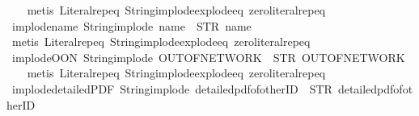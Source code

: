 \begin{isabellebody}
%
\isadelimproof
\ \ %
\endisadelimproof
%
\isatagproof
{}\isamarkupfalse%
\ {\isacharparenleft}metis\ Literal{\isachardot}rep{\isacharunderscore}eq\ String{\isachardot}implode{\isacharunderscore}explode{\isacharunderscore}eq\ zero{\isacharunderscore}literal{\isachardot}rep{\isacharunderscore}eq{\isacharparenright}%
\endisatagproof
{\isafoldproof}%
%
\isadelimproof
\isanewline
%
\endisadelimproof
\isanewline
{}\isamarkupfalse%
\ implode{\isacharunderscore}name{\isacharcolon}\ {\isachardoublequoteopen}String{\isachardot}implode\ {\isacharprime}{\isacharprime}name{\isacharprime}{\isacharprime}\ {\isacharequal}\ STR\ {\isacharprime}{\isacharprime}name{\isacharprime}{\isacharprime}{\isachardoublequoteclose}\isanewline
%
\isadelimproof
\ \ %
\endisadelimproof
%
\isatagproof
{}\isamarkupfalse%
\ {\isacharparenleft}metis\ Literal{\isachardot}rep{\isacharunderscore}eq\ String{\isachardot}implode{\isacharunderscore}explode{\isacharunderscore}eq\ zero{\isacharunderscore}literal{\isachardot}rep{\isacharunderscore}eq{\isacharparenright}%
\endisatagproof
{\isafoldproof}%
%
\isadelimproof
\isanewline
%
\endisadelimproof
\isanewline
{}\isamarkupfalse%
\ implode{\isacharunderscore}OON{\isacharcolon}\ {\isachardoublequoteopen}String{\isachardot}implode\ {\isacharprime}{\isacharprime}OUT{\isacharunderscore}OF{\isacharunderscore}NETWORK{\isacharprime}{\isacharprime}\ {\isacharequal}\ STR\ {\isacharprime}{\isacharprime}OUT{\isacharunderscore}OF{\isacharunderscore}NETWORK{\isacharprime}{\isacharprime}{\isachardoublequoteclose}\isanewline
%
\isadelimproof
\ \ %
\endisadelimproof
%
\isatagproof
{}\isamarkupfalse%
\ {\isacharparenleft}metis\ Literal{\isachardot}rep{\isacharunderscore}eq\ String{\isachardot}implode{\isacharunderscore}explode{\isacharunderscore}eq\ zero{\isacharunderscore}literal{\isachardot}rep{\isacharunderscore}eq{\isacharparenright}%
\endisatagproof
{\isafoldproof}%
%
\isadelimproof
\isanewline
%
\endisadelimproof
\isanewline
{}\isamarkupfalse%
\ implode{\isacharunderscore}detailedPDF{\isacharcolon}\ {\isachardoublequoteopen}String{\isachardot}implode\ {\isacharprime}{\isacharprime}detailed{\isacharunderscore}pdf{\isacharunderscore}of{\isacharunderscore}otherID{\isacharprime}{\isacharprime}\ {\isacharequal}\ STR\ {\isacharprime}{\isacharprime}detailed{\isacharunderscore}pdf{\isacharunderscore}of{\isacharunderscore}otherID{\isacharprime}{\isacharprime}{\isachardoublequoteclose}\isanewline
%
\isadelimproof
\ \ %
\endisadelimproof
%
\isatagproof
{}\isamarkupfalse%

\end{isabellebody}
